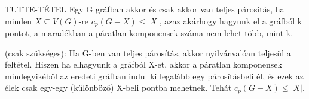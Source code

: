 \begin{tetel}{TUTTE-TÉTEL}
Egy G gráfban akkor és csak akkor van teljes párosítás, ha minden $X \subseteq V(G)$-re $c_p(G - X)\leq |X|$, azaz akárhogy hagyunk el a gráfból k pontot, a maradékban a páratlan komponensek száma nem lehet több, mint k.
\end{tetel}

\begin{bizonyitas}{}
(csak szükséges): Ha G-ben van teljes párosítás, akkor nyilvánvalóan teljesül a feltétel. Hiszen ha elhagyunk a gráfból X-et, akkor a páratlan komponensek mindegyikéből az eredeti gráfban indul ki legalább egy párosításbeli él, és ezek az élek csak egy-egy (különböző) X-beli pontba mehetnek. Tehát $c_p(G - X) \leq |X|$.
\end{bizonyitas}
